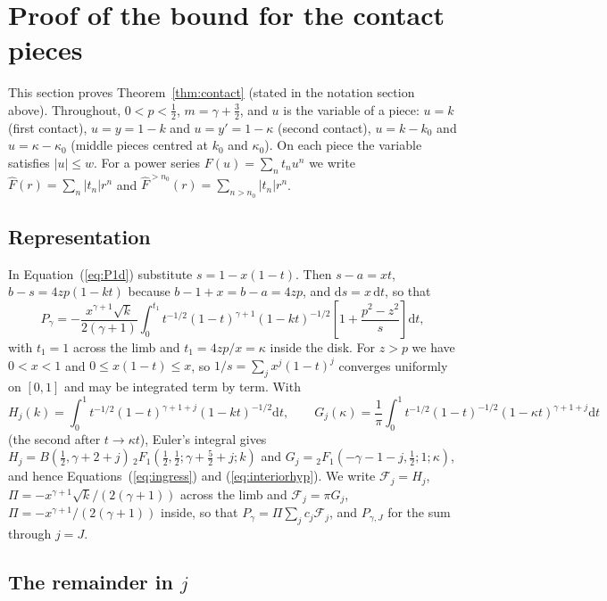 \documentclass[11pt]{article}
\newcommand{\dd}{\mathrm{d}}
\begin{document}
\section{Proof of the bound for the contact pieces} \label{app:contactproof}

This section proves Theorem~\ref{thm:contact} (stated in the notation section above). Throughout, $0<p<\tfrac12$, $m=\gamma+\tfrac32$, and $u$ is the variable of a piece: $u=k$ (first contact), $u=y=1-k$ and $u=y'=1-\kappa$ (second contact), $u=k-k_0$ and $u=\kappa-\kappa_0$ (middle pieces centred at $k_0$ and $\kappa_0$). On each piece the variable satisfies $|u|\le w$. For a power series $F(u)=\sum_nt_nu^n$ we write $\hat F(r)=\sum_n|t_n|r^n$ and $\hat F^{>n_0}(r)=\sum_{n>n_0}|t_n|r^n$.

\subsection{Representation}

In Equation~(\ref{eq:P1d}) substitute $s=1-x(1-t)$. Then $s-a=xt$, $b-s=4zp(1-kt)$ because $b-1+x=b-a=4zp$, and $\dd s=x\,\dd t$, so that
\begin{equation}
P_\gamma=-\frac{x^{\gamma+1}\sqrt k}{2(\gamma+1)}\int_0^{t_1}t^{-1/2}(1-t)^{\gamma+1}(1-kt)^{-1/2}\left[1+\frac{p^2-z^2}{s}\right]\dd t, \label{eq:Pt}
\end{equation}
with $t_1=1$ across the limb and $t_1=4zp/x=\kappa$ inside the disk. For $z>p$ we have $0<x<1$ and $0\le x(1-t)\le x$, so $1/s=\sum_jx^j(1-t)^j$ converges uniformly on $[0,1]$ and may be integrated term by term. With
\begin{equation}
H_j(k)=\int_0^1t^{-1/2}(1-t)^{\gamma+1+j}(1-kt)^{-1/2}\dd t,\qquad
G_j(\kappa)=\frac1\pi\int_0^1t^{-1/2}(1-t)^{-1/2}(1-\kappa t)^{\gamma+1+j}\dd t \label{eq:HG}
\end{equation}
(the second after $t\to\kappa t$), Euler's integral \citep[15.6.1]{DLMF} gives $H_j=B(\tfrac12,\gamma+2+j)\,{}_2F_1(\tfrac12,\tfrac12;\gamma+\tfrac52+j;k)$ and $G_j={}_2F_1(-\gamma-1-j,\tfrac12;1;\kappa)$, and hence Equations~(\ref{eq:ingress}) and (\ref{eq:interiorhyp}). We write $\mathcal F_j=H_j$, $\Pi=-x^{\gamma+1}\sqrt k/(2(\gamma+1))$ across the limb and $\mathcal F_j=\pi G_j$, $\Pi=-x^{\gamma+1}/(2(\gamma+1))$ inside, so that $P_\gamma=\Pi\sum_jc_j\mathcal F_j$, and $P_{\gamma,J}$ for the sum through $j=J$.

\subsection{The remainder in $j$}
\end{document}
